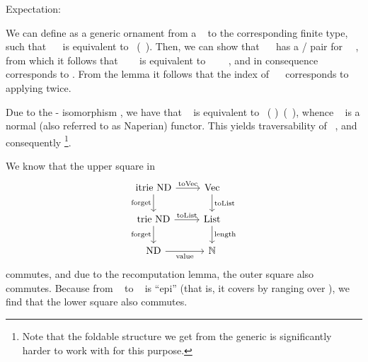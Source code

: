 Expectation:

We can define  as a generic ornament from a \  to the corresponding finite type, such that \ \  is equivalent to \ (\ ). Then, we can show that \ \  has a / pair for \ \ , from which it follows that \ \ \  is equivalent to \ \ \ \ , and in consequence \  corresponds to . From the  lemma it follows that the index  of \ \  corresponds to applying  twice.

Due to the - isomorphism \cite{algorn}, we have that \  is equivalent to \ ( )\ (\ ), whence \  is a normal (also referred to as Naperian) functor. This yields traversability of \ , and consequently \footnote{Note that the foldable structure we get from the generic  is significantly harder to work with for this purpose.}. 

We know that the upper square in
\[\begin{tikzcd}
	{\mathrm{itrie}\ \mathrm{ND}} & {\mathrm{Vec}} \\
	{\mathrm{trie}\ \mathrm{ND}} & {\mathrm{List}} \\
	{\mathrm{ND}} & {\mathbb{N}}
	\arrow["{\mathrm{toList}}", from=2-1, to=2-2]
	\arrow["{\mathrm{forget}}"', from=1-1, to=2-1]
	\arrow["{\mathrm{toVec}}", from=1-1, to=1-2]
	\arrow["{\mathrm{toList}}", from=1-2, to=2-2]
	\arrow["{\mathrm{value}}"', from=3-1, to=3-2]
	\arrow["{\mathrm{forget}}"', from=2-1, to=3-1]
	\arrow["{\mathrm{length}}", from=2-2, to=3-2]
\end{tikzcd}\]
commutes, and due to the recomputation lemma, the outer square also commutes. Because  from \  to \  is ``epi'' (that is, it covers by ranging over ), we find that the lower square also commutes.

